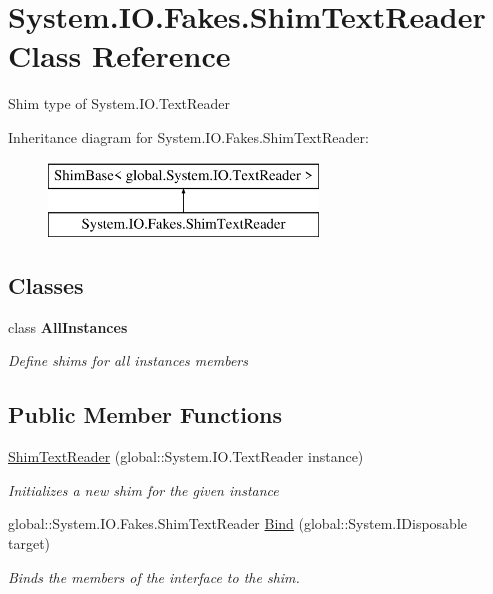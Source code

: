 \hypertarget{class_system_1_1_i_o_1_1_fakes_1_1_shim_text_reader}{\section{System.\-I\-O.\-Fakes.\-Shim\-Text\-Reader Class Reference}
\label{class_system_1_1_i_o_1_1_fakes_1_1_shim_text_reader}
}


Shim type of System.\-I\-O.\-Text\-Reader 


Inheritance diagram for System.\-I\-O.\-Fakes.\-Shim\-Text\-Reader\-:\begin{figure}[H]
\begin{center}
\leavevmode
\includegraphics[height=2.000000cm]{class_system_1_1_i_o_1_1_fakes_1_1_shim_text_reader}
\end{center}
\end{figure}
\subsection*{Classes}
\begin{DoxyCompactItemize}
\item 
class {\bfseries All\-Instances}
\begin{DoxyCompactList}\small\item\em Define shims for all instances members\end{DoxyCompactList}\end{DoxyCompactItemize}
\subsection*{Public Member Functions}
\begin{DoxyCompactItemize}
\item 
\hyperlink{class_system_1_1_i_o_1_1_fakes_1_1_shim_text_reader_aca62549423953a770d78d6ae9f76edea}{Shim\-Text\-Reader} (global\-::\-System.\-I\-O.\-Text\-Reader instance)
\begin{DoxyCompactList}\small\item\em Initializes a new shim for the given instance\end{DoxyCompactList}\item 
global\-::\-System.\-I\-O.\-Fakes.\-Shim\-Text\-Reader \hyperlink{class_system_1_1_i_o_1_1_fakes_1_1_shim_text_reader_a01d191855f8be52ab666ace1c8e62d66}{Bind} (global\-::\-System.\-I\-Disposable target)
\begin{DoxyCompactList}\small\item\em Binds the members of the interface to the shim.\end{DoxyCompactList}\end{DoxyCompactItemize}
